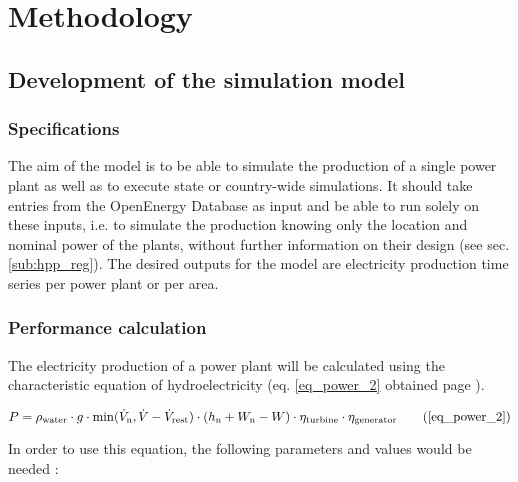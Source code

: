 \chapter{Methodology}
\label{chap:methodology}

\section{Development of the simulation model}

\subsection{Specifications}
\label{sub:spec}

The aim of the model is to be able to simulate the production of a single power plant as well as to execute state or country-wide simulations. It should take entries from the OpenEnergy Database as input and be able to run solely on these inputs, i.e. to simulate the production knowing only the location and nominal power of the plants, without further information on their design (see sec. \ref{sub:hpp_reg}). 
The desired outputs for the model are electricity production time series per power plant or per area.


\subsection{Performance calculation}
\label{sub:perf_calc}

The electricity production of a power plant will be calculated using the characteristic equation of hydroelectricity (eq. \ref{eq_power_2} obtained page \pageref{eq_power_2}).

\begin{equation}
 P = \rho_\mathrm{water} \cdot g \cdot \min(\dot{V}_\mathrm{n},\dot{V}-\dot{V}_\mathrm{rest}) \cdot (h_\mathrm{n} +W_\mathrm{n}-W) \cdot \eta_\mathrm{turbine} \cdot \eta_\mathrm{generator}\tag{\ref{eq_power_2}}
\end{equation}

In order to use this equation, the following parameters and values would be needed : 

